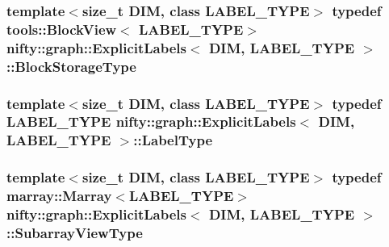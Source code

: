 \subsubsection[{Block\+Storage\+Type}]{\setlength{\rightskip}{0pt plus 5cm}template$<$size\+\_\+t D\+I\+M, class L\+A\+B\+E\+L\+\_\+\+T\+Y\+P\+E$>$ typedef {\bf tools\+::\+Block\+View}$<$ L\+A\+B\+E\+L\+\_\+\+T\+Y\+P\+E$>$ {\bf nifty\+::graph\+::\+Explicit\+Labels}$<$ D\+I\+M, L\+A\+B\+E\+L\+\_\+\+T\+Y\+P\+E $>$\+::{\bf Block\+Storage\+Type}}\label{classnifty_1_1graph_1_1ExplicitLabels_a896653b58048ec52d8e00800279d9b53}
\hypertarget{classnifty_1_1graph_1_1ExplicitLabels_a3defd2851b5e7071f23a0fdea7aafff0}{}
\subsubsection[{Label\+Type}]{\setlength{\rightskip}{0pt plus 5cm}template$<$size\+\_\+t D\+I\+M, class L\+A\+B\+E\+L\+\_\+\+T\+Y\+P\+E$>$ typedef L\+A\+B\+E\+L\+\_\+\+T\+Y\+P\+E {\bf nifty\+::graph\+::\+Explicit\+Labels}$<$ D\+I\+M, L\+A\+B\+E\+L\+\_\+\+T\+Y\+P\+E $>$\+::{\bf Label\+Type}}\label{classnifty_1_1graph_1_1ExplicitLabels_a3defd2851b5e7071f23a0fdea7aafff0}
\hypertarget{classnifty_1_1graph_1_1ExplicitLabels_ae07fe2aed8059beb43b043e8a3becdb7}{}
\subsubsection[{Subarray\+View\+Type}]{\setlength{\rightskip}{0pt plus 5cm}template$<$size\+\_\+t D\+I\+M, class L\+A\+B\+E\+L\+\_\+\+T\+Y\+P\+E$>$ typedef marray\+::\+Marray$<$L\+A\+B\+E\+L\+\_\+\+T\+Y\+P\+E$>$ {\bf nifty\+::graph\+::\+Explicit\+Labels}$<$ D\+I\+M, L\+A\+B\+E\+L\+\_\+\+T\+Y\+P\+E $>$\+::{\bf Subarray\+View\+Type}}\label{classnifty_1_1graph_1_1ExplicitLabels_ae07fe2aed8059beb43b043e8a3becdb7}
\hypertarget{classnifty_1_1graph_1_1ExplicitLabels_aaab98314403b95503bf0c32e65fd1884}{}
